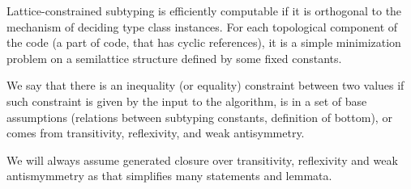 Lattice-constrained subtyping is efficiently computable if it is orthogonal to the mechanism of deciding type class instances. For each topological component of the code (a part of code, that has cyclic references), it is a simple minimization problem on a semilattice structure defined by some fixed constants.

\begin{cor}
    We say that there is an inequality (or equality) constraint between two values if such constraint is given by the input to the algorithm, is in a set of base assumptions (relations between subtyping constants, definition of bottom), or comes from transitivity, reflexivity, and weak antisymmetry.

    We will always assume generated closure over transitivity, reflexivity and weak antismymmetry as that simplifies many statements and lemmata.
\end{cor}

